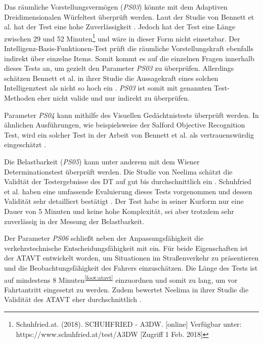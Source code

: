 Das räumliche Vorstellungsvermögen (\textit{PS03}) könnte mit dem Adaptiven Dreidimensionalen Würfeltest überprüft werden. Laut der Studie von Bennett et al. hat der Test eine hohe Zuverlässigkeit \cite{cognitivetestsfitnesstodrive}. Jedoch hat der Test eine Länge zwischen 29 und 52 Minuten\footnote{Schuhfried.at. (2018). SCHUHFRIED - A3DW. [online] Verfügbar unter: https://www.schuhfried.at/test/A3DW [Zugriff 1 Feb. 2018]} und wäre in dieser Form nicht einsetzbar. Der Intelligenz-Basis-Funktionen-Test prüft die räumliche Vorstellungskraft ebenfalls indirekt über einzelne Items. Somit kommt es auf die einzelnen Fragen innerhalb dieses Tests an, um gezielt den Parameter \textit{PS03} zu überprüfen. Allerdings schätzen Bennett et al. in ihrer Studie die Aussagekraft eines solchen Intelligenztest als nicht so hoch ein \cite{cognitivetestsfitnesstodrive}. \textit{PS03} ist somit mit genannten Test-Methoden eher nicht valide und nur indirekt zu überprüfen.

Parameter \textit{PS04} kann mithilfe des Visuellen Gedächtnistests überprüft werden. In ähnlichen Ausführungen, wie beispielsweise der Salford Objective Recognition Test, wird ein solcher Test in der Arbeit von Bennett et al. als vertrauenswürdig eingeschätzt \cite{cognitivetestsfitnesstodrive}.

Die Belastbarkeit (\textit{PS05})  kann unter anderem mit dem Wiener Determinationstest überprüft werden. Die Studie von Neelima schätzt die Validtät der Testergebnisse des DT auf gut bis durchschnittlich ein \cite{indiaassessment}. Schuhfried et al. haben eine umfassende Evaluierung dieses Tests vorgenommen und dessen Validität sehr detailliert bestätigt \cite{wiendt}. Der Test habe in seiner Kurform nur eine Dauer von 5 Minuten und keine hohe Komplexität, sei aber trotzdem sehr zuverlässig in der Messung der Belastbarkeit.

Der Parameter \textit{PS06} schließt neben der Anpassungsfähigkeit die verkehrstechnische Entscheidungsfähigkeit mit ein. Für beide Eigenschaften ist der ATAVT entwickelt worden, um Situationen im Straßenverkehr zu präsentieren und die Beobachtungsfähigkeit des Fahrers einzuschätzen. Die Länge des Tests ist auf mindestens 8 Minuten\textsuperscript{\ref{foot:atavt}}  einzuordnen und somit zu lang, um vor Fahrtantritt eingesetzt zu werden. Zudem bewertet Neelima in ihrer Studie die Validität des ATAVT eher durchschnittlich \cite{indiaassessment}.

